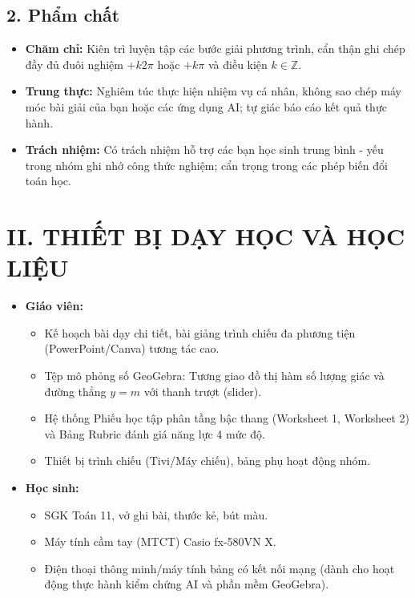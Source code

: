 \documentclass[12pt, a4paper]{article}
\begin{document}
\subsection*{2. Phẩm chất}  
\begin{itemize}[leftmargin=1.2cm]  
    \item \textbf{Chăm chỉ:} Kiên trì luyện tập các bước giải phương trình, cẩn thận ghi chép đầy đủ đuôi nghiệm $+ k2\pi$ hoặc $+ k\pi$ và điều kiện $k \in \mathbb{Z}$.  
    \item \textbf{Trung thực:} Nghiêm túc thực hiện nhiệm vụ cá nhân, không sao chép máy móc bài giải của bạn hoặc các ứng dụng AI; tự giác báo cáo kết quả thực hành.  
    \item \textbf{Trách nhiệm:} Có trách nhiệm hỗ trợ các bạn học sinh trung bình - yếu trong nhóm ghi nhớ công thức nghiệm; cẩn trọng trong các phép biến đổi toán học.  
\end{itemize}  
  
\section*{II. THIẾT BỊ DẠY HỌC VÀ HỌC LIỆU}  
\begin{itemize}[leftmargin=1.2cm]  
    \item \textbf{Giáo viên:}  
    \begin{itemize}[leftmargin=0.6cm]  
        \item Kế hoạch bài dạy chi tiết, bài giảng trình chiếu đa phương tiện (PowerPoint/Canva) tương tác cao.  
        \item Tệp mô phỏng số GeoGebra: Tương giao đồ thị hàm số lượng giác và đường thẳng $y = m$ với thanh trượt (slider).  
        \item Hệ thống Phiếu học tập phân tầng bậc thang (Worksheet 1, Worksheet 2) và Bảng Rubric đánh giá năng lực 4 mức độ.  
        \item Thiết bị trình chiếu (Tivi/Máy chiếu), bảng phụ hoạt động nhóm.  
    \end{itemize}  
    \item \textbf{Học sinh:}  
    \begin{itemize}[leftmargin=0.6cm]  
        \item SGK Toán 11, vở ghi bài, thước kẻ, bút màu.  
        \item Máy tính cầm tay (MTCT) Casio fx-580VN X.  
        \item Điện thoại thông minh/máy tính bảng có kết nối mạng (dành cho hoạt động thực hành kiểm chứng AI và phần mềm GeoGebra).  
    \end{itemize}  
\end{itemize}  
  
\end{document}
